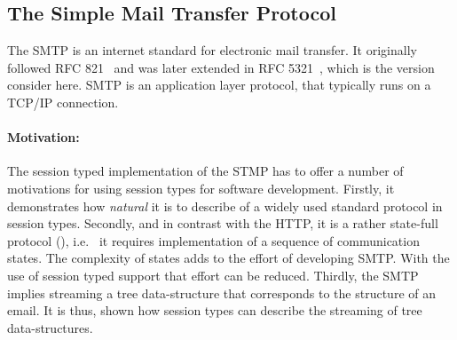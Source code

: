 \subsection{The Simple Mail Transfer Protocol}

The SMTP is an internet standard for electronic
mail transfer. It originally followed 
RFC 821~\cite{SMTP-rfc} and was later extended 
in RFC 5321~\cite{ESMTP-rfc}, which is the version consider here.
SMTP is an application layer protocol, that typically runs on
a TCP/IP connection.

\paragraph{Motivation:}
The session typed implementation of the STMP has to offer
a number of motivations for using session types for software
development.
Firstly, it demonstrates how {\em natural} it is
to describe of a widely used standard protocol in session types.
Secondly, and in contrast with the HTTP, it is
a rather state-full protocol (),
i.e.~ it requires implementation of a sequence of communication states.
The complexity of states adds to the effort of 
developing SMTP. With the use of session typed
support that effort can be reduced.
Thirdly, the SMTP implies streaming a tree
data-structure that corresponds to the structure
of an email.
It is thus, shown how session types can describe
the streaming of tree data-structures.


%
%

